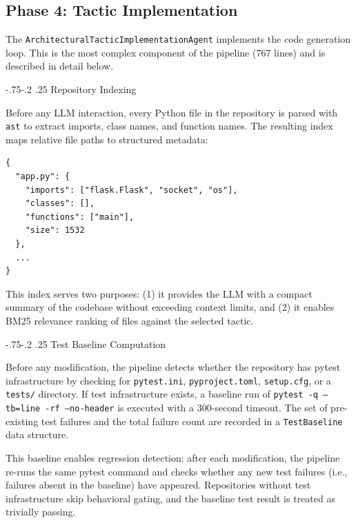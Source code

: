 \documentclass[sigconf,review,anonymous]{acmart}
\makeatletter
\renewcommand\subsubsection{\def\@toclevel{3}%
  \@startsection{subsubsection}{3}{\z@}%
  {-.75\baselineskip \@plus -2\p@ \@minus -.2\p@}%
  {.25\baselineskip}%
  {\ACM@NRadjust{\sffamily\bfseries\section@raggedright}}}
\makeatother
\begin{document}
\subsection{Phase 4: Tactic Implementation}
\label{sec:impl_tactic_implementation}

The \texttt{ArchitecturalTacticImplementationAgent} implements the code generation loop. This is the most complex component of the pipeline (767 lines) and is described in detail below.

\subsubsection{Repository Indexing}

Before any LLM interaction, every Python file in the repository is parsed with \texttt{ast} to extract imports, class names, and function names. The resulting index maps relative file paths to structured metadata:

\begin{verbatim}
{
  "app.py": {
    "imports": ["flask.Flask", "socket", "os"],
    "classes": [],
    "functions": ["main"],
    "size": 1532
  },
  ...
}
\end{verbatim}

This index serves two purposes: (1) it provides the LLM with a compact summary of the codebase without exceeding context limits, and (2) it enables BM25 relevance ranking of files against the selected tactic.

\subsubsection{Test Baseline Computation}

Before any modification, the pipeline detects whether the repository has pytest infrastructure by checking for \texttt{pytest.ini}, \texttt{pyproject.toml}, \texttt{setup.cfg}, or a \texttt{tests/} directory. If test infrastructure exists, a baseline run of \texttt{pytest -q --tb=line -rf --no-header} is executed with a 300-second timeout. The set of pre-existing test failures and the total failure count are recorded in a \texttt{TestBaseline} data structure.

This baseline enables regression detection: after each modification, the pipeline re-runs the same pytest command and checks whether any new test failures (i.e., failures absent in the baseline) have appeared. Repositories without test infrastructure skip behavioral gating, and the baseline test result is treated as trivially passing.
\end{document}
